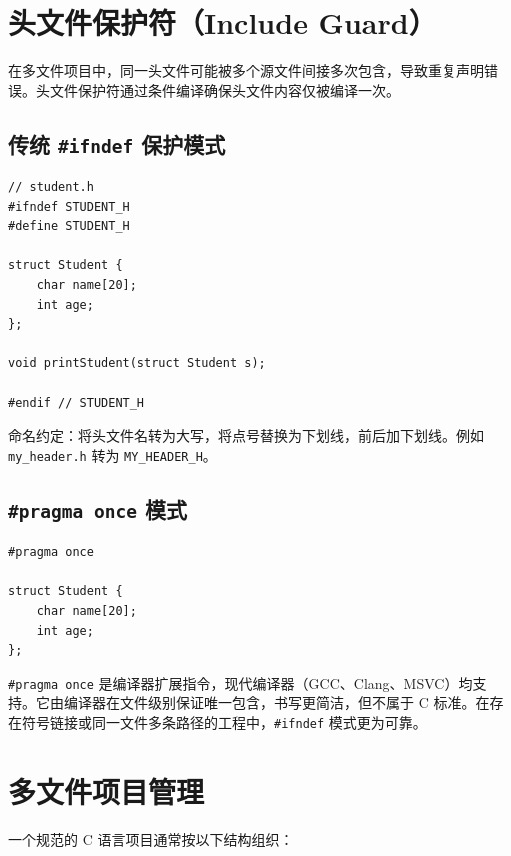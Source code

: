 \section{头文件保护符（Include Guard）}

在多文件项目中，同一头文件可能被多个源文件间接多次包含，导致重复声明错误。头文件保护符通过条件编译确保头文件内容仅被编译一次。

\subsection{传统 \texttt{\#ifndef} 保护模式}

\begin{lstlisting}[caption={头文件保护符}]
// student.h
#ifndef STUDENT_H
#define STUDENT_H

struct Student {
    char name[20];
    int age;
};

void printStudent(struct Student s);

#endif // STUDENT_H
\end{lstlisting}

命名约定：将头文件名转为大写，将点号替换为下划线，前后加下划线。例如 \texttt{my\_header.h} 转为 \texttt{MY\_HEADER\_H}。

\subsection{\texttt{\#pragma once} 模式}

\begin{lstlisting}[caption={pragma once}]
#pragma once

struct Student {
    char name[20];
    int age;
};
\end{lstlisting}

\texttt{\#pragma once} 是编译器扩展指令，现代编译器（GCC、Clang、MSVC）均支持。它由编译器在文件级别保证唯一包含，书写更简洁，但不属于 C 标准。在存在符号链接或同一文件多条路径的工程中，\texttt{\#ifndef} 模式更为可靠。

\section{多文件项目管理}

一个规范的 C 语言项目通常按以下结构组织：

